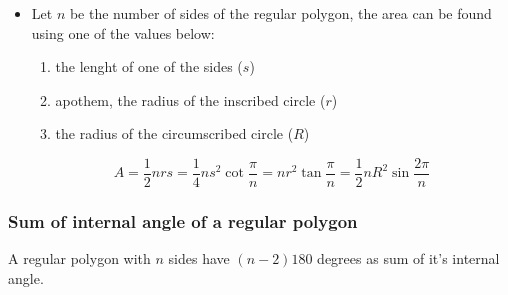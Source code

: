     \begin{itemize}
        \item Let $n$ be the number of sides of the regular polygon, the area can be found using one of the values below:
            \begin{enumerate}
                \item  the lenght of one of the sides ($s$)
                \item apothem, the radius of the inscribed circle ($r$)
                \item the radius of the circumscribed circle ($R$)
            \end{enumerate}

        \[
            A = \frac{1}{2}nrs = \frac{1}{4}ns^2\cot \frac{\pi}{n} = nr^2\tan \frac{\pi}{n} = \frac{1}{2}nR^2\sin \frac{2\pi}{n}
        \]

    \end{itemize}


\subsubsection{Sum of internal angle of a regular polygon}
A regular polygon with $n$ sides have $(n-2)180$ degrees as sum of it's internal angle.
